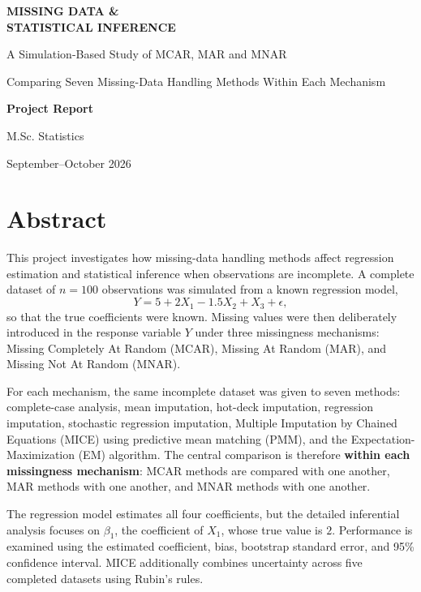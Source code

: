 \documentclass[11pt,a4paper]{article}
\begin{document}
\begin{titlepage}
\thispagestyle{empty}
\centering
\vspace*{1.25in}
{\Huge\bfseries MISSING DATA \&\\ STATISTICAL INFERENCE\par}
\vspace{0.35in}
{\Large A Simulation-Based Study of MCAR, MAR and MNAR\par}
\vspace{0.25in}
{\large Comparing Seven Missing-Data Handling Methods Within Each Mechanism\par}
\vspace{1.0in}
{\Large \textbf{Project Report}\par}
\vspace{0.2in}
{\large M.Sc. Statistics\par}
\vfill
{\large September--October 2026\par}
\end{titlepage}

\section*{Abstract}
This project investigates how missing-data handling methods affect regression estimation and statistical inference when observations are incomplete. A complete dataset of $n=100$ observations was simulated from a known regression model,
\[
Y = 5 + 2X_1 - 1.5X_2 + X_3 + \epsilon,
\]
so that the true coefficients were known. Missing values were then deliberately introduced in the response variable $Y$ under three missingness mechanisms: Missing Completely At Random (MCAR), Missing At Random (MAR), and Missing Not At Random (MNAR).

For each mechanism, the same incomplete dataset was given to seven methods: complete-case analysis, mean imputation, hot-deck imputation, regression imputation, stochastic regression imputation, Multiple Imputation by Chained Equations (MICE) using predictive mean matching (PMM), and the Expectation-Maximization (EM) algorithm. The central comparison is therefore \textbf{within each missingness mechanism}: MCAR methods are compared with one another, MAR methods with one another, and MNAR methods with one another.

The regression model estimates all four coefficients, but the detailed inferential analysis focuses on $\beta_1$, the coefficient of $X_1$, whose true value is $2$. Performance is examined using the estimated coefficient, bias, bootstrap standard error, and 95\% confidence interval. MICE additionally combines uncertainty across five completed datasets using Rubin's rules.
\end{document}
